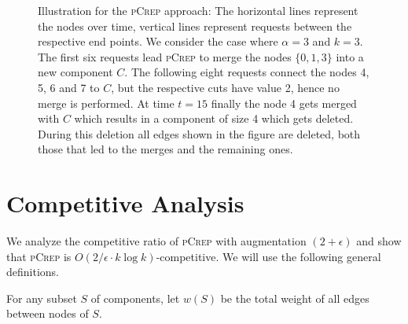 \documentclass[a4paper,UKenglish,cleveref, autoref, thm-restate,authorcolumns]{lipics-v2019}
\newcommand{\adjDel}{\textsc{pCrep}}
\newcommand{\request}[3]{\draw (axis cs:#3,#1) -- node[left]{} (axis cs:#3,#2);}
\begin{document}
\begin{figure}[t]
	\centering
	\caption{Illustration for the \adjDel{} approach: The horizontal lines represent the nodes over time, vertical lines represent requests between the respective end points.  We consider the case where $\alpha=3$ and $k=3$.
	The first six requests lead \adjDel{} to merge the nodes $\{0,1,3\}$ into
	a new component $C$. The following eight requests connect the nodes 4, 5, 6 and 7 to $C$,
	but the respective cuts have value 2, hence no merge is performed. At time $t=15$ finally the node 4 gets merged with $C$ which results in a component of size 4 which gets deleted.
	During this deletion all edges shown in the figure are deleted, both those that led to the merges and the remaining ones.}\label{exOldCrep}
	
\end{figure}		

\section{Competitive Analysis}
\label{comp_analysis_section}

We analyze the competitive ratio of \adjDel{} with augmentation $(2+\epsilon)$ and show that \adjDel{} is $O(2/\epsilon\cdot k\log k)$-competitive.
We will use the following general definitions.

\begin{definition}
	For any subset $S$ of components, let $w(S)$ be 
	the total weight of all edges between nodes of $S$.
\end{definition}
\end{document}

